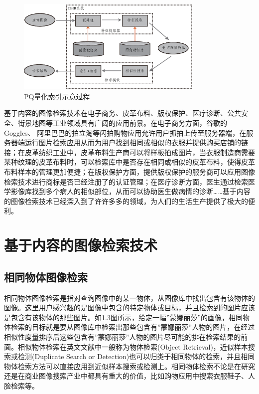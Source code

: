 \documentclass[color=cyan,mathpazo,titlestyle=hang]{elegantbook}
\begin{document}
\begin{figure}[!hbtp]
\centering  %
\includegraphics[width=0.8\textwidth]{./figure/cbirFramework.eps}
\caption{PQ量化索引示意过程\label{pq_ex1}}
\end{figure}

基于内容的图像检索技术在电子商务、皮革布料、版权保护、医疗诊断、公共安全、街景地图等工业领域具有广阔的应用前景。在电子商务方面，谷歌的Goggles、 阿里巴巴的拍立淘等闪拍购物应用允许用户抓拍上传至服务器端，在服务器端运行图片检索应用从而为用户找到相同或相似的衣服并提供购买店铺的链接；在皮革纺织工业中，皮革布料生产商可以将样板拍成图片，当衣服制造商需要某种纹理的皮革布料时，可以检索库中是否存在相同或相似的皮革布料，使得皮革布料样本的管理更加便捷；在版权保护方面，提供版权保护的服务商可以应用图像检索技术进行商标是否已经注册了的认证管理；在医疗诊断方面，医生通过检索医学影像库找到多个病人的相似部位，从而可以协助医生做病情的诊断……基于内容的图像检索技术已经深入到了许许多多的领域，为人们的生活生产提供了极大的便利。

\section{基于内容的图像检索技术}

\subsection{相同物体图像检索}

相同物体图像检索是指对查询图像中的某一物体，从图像库中找出包含有该物体的图像。这里用户感兴趣的是图像中包含的特定物体或目标，并且检索到的图片应该是包含有该物体的那些图片。如1.3图所示，给定一幅”蒙娜丽莎”的画像，相同物体检索的目标就是要从图像库中检索出那些包含有”蒙娜丽莎”人物的图片，在经过相似性度量排序后这些包含有”蒙娜丽莎”人物的图片尽可能的排在检索结果的前面。相似物体检索在英文文献中一般称为物体检索(Object Retrieval)，近似样本搜索或检测(Duplicate Search or Detection)也可以归类于相同物体的检索，并且相同物体检索方法可以直接应用到近似样本搜索或检测上。相同物体检索不论是在研究还是在商业图像搜索产业中都具有重大的价值，比如购物应用中搜索衣服鞋子、人脸检索等。
\end{document}
